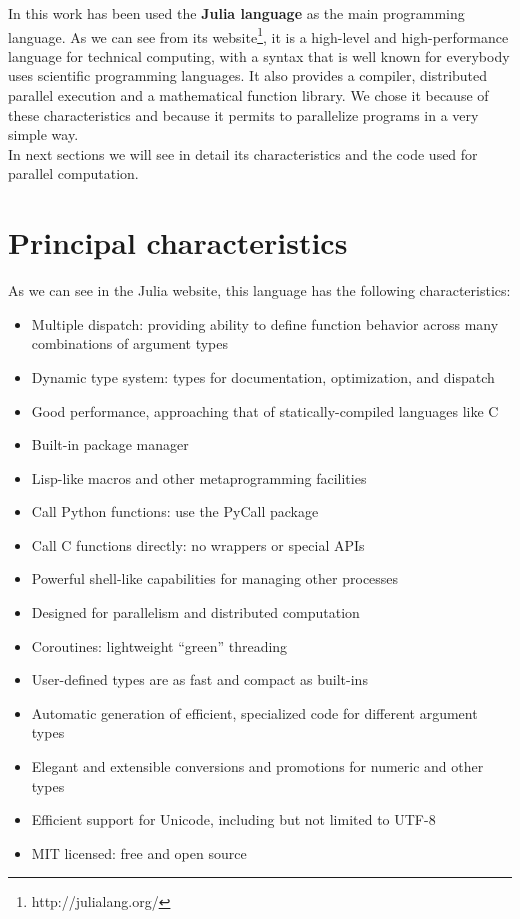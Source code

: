 In this work has been used the \textbf{Julia language} as the main programming language. As we can see from its website\footnote{http://julialang.org/}, it is a high-level and high-performance language for technical computing, with a syntax that is well known for everybody uses scientific programming languages. It also provides a compiler, distributed parallel execution and a mathematical function library. We chose it because of these characteristics and because it permits to parallelize programs in a very simple way.\\

In next sections we will see in detail its characteristics and the code used for parallel computation.

\section{Principal characteristics}\label{sec23:julia}
As we can see in the Julia website, this language has the following characteristics:
\begin{itemize}
 \item Multiple dispatch: providing ability to define function behavior across many combinations of argument types
 \item Dynamic type system: types for documentation, optimization, and dispatch
 \item Good performance, approaching that of statically-compiled languages like C
 \item Built-in package manager
 \item Lisp-like macros and other metaprogramming facilities
 \item Call Python functions: use the PyCall package
 \item Call C functions directly: no wrappers or special APIs
 \item Powerful shell-like capabilities for managing other processes
 \item Designed for parallelism and distributed computation
 \item Coroutines: lightweight “green” threading
 \item User-defined types are as fast and compact as built-ins
 \item Automatic generation of efficient, specialized code for different argument types
 \item Elegant and extensible conversions and promotions for numeric and other types
 \item Efficient support for Unicode, including but not limited to UTF-8
 \item MIT licensed: free and open source
\end{itemize}


